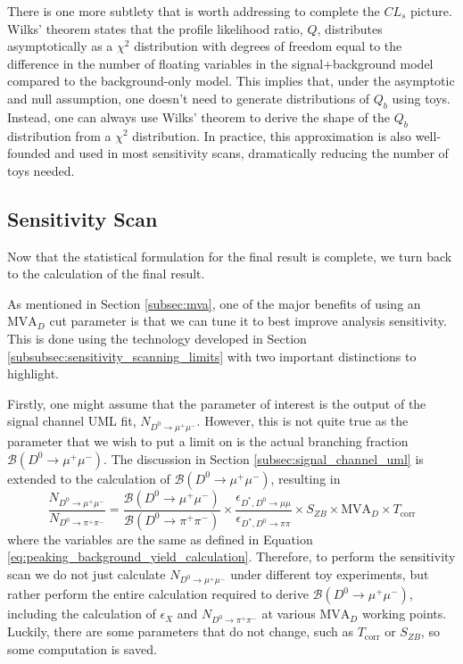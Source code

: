 There is one more subtlety that is worth addressing to complete the $CL_s$ picture. Wilks' theorem states that the profile likelihood ratio, $Q$, distributes asymptotically as a $\chi^2$ distribution with degrees of freedom equal to the difference in the number of floating variables in the signal+background model compared to the background-only model. This implies that, under the asymptotic and null assumption, one doesn't need to generate distributions of $Q_b$ using toys. Instead, one can always use Wilks' theorem to derive the shape of the $Q_b$ distribution from a $\chi^2$ distribution. In practice, this approximation is also well-founded and used in most sensitivity scans, dramatically reducing the number of toys needed. 

\subsection{Sensitivity Scan}
\label{subsec:sensitivity_scan}

Now that the statistical formulation for the final result is complete, we turn back to the calculation of the final result. 

As mentioned in Section \ref{subsec:mva}, one of the major benefits of using an $\text{MVA}_D$ cut parameter is that we can tune it to best improve analysis sensitivity. This is done using the technology developed in Section \ref{subsubsec:sensitivity_scanning_limits} with two important distinctions to highlight.

Firstly, one might assume that the parameter of interest is the output of the signal channel UML fit, $N_{D^0 \to \mu^+ \mu^-}$. However, this is not quite true as the parameter that we wish to put a limit on is the actual branching fraction $\mathcal{B}(D^0 \to \mu^+ \mu^-)$. The discussion in Section \ref{subsec:signal_channel_uml} is extended to the calculation of $\mathcal{B}(D^0 \to \mu^+ \mu^-)$, resulting in 
\begin{equation}
    \frac{N_{D^0 \to \mu^+  \mu^-}}{N_{D^0 \to \pi^+ \pi^-}} = \frac{\mathcal{B}(D^0 \to \mu^+ \mu^-)}{\mathcal{B}(D^0 \to \pi^+ \pi^-)}\times \frac{\epsilon_{D^*, D^0\to\mu\mu}}{\epsilon_{D^*, D^0\to\pi\pi}} \times S_{ZB} \times \text{MVA}_D \times T_{\text{corr}} 
\end{equation}
where the variables are the same as defined in Equation \ref{eq:peaking_background_yield_calculation}. Therefore, to perform the sensitivity scan we do not just calculate $N_{D^0 \to \mu^+ \mu^-}$ under different toy experiments, but rather perform the entire calculation required to derive $\mathcal{B}(D^0 \to \mu^+ \mu^-)$, including the calculation of $\epsilon_X$ and $N_{D^0 \to \pi^+ \pi^-}$ at various $\text{MVA}_D$ working points. Luckily, there are some parameters that do not change, such as $T_{\text{corr}}$ or $S_{ZB}$, so some computation is saved.

